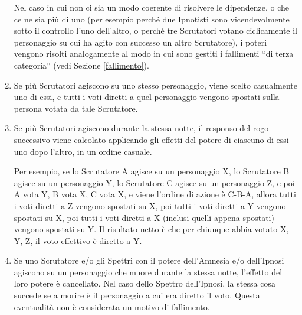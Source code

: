 \documentclass[a4paper,10pt]{article}
\begin{document}
\begin{enumerate}
	Nel caso in cui non ci sia un modo coerente di risolvere le dipendenze, o che ce ne sia più di uno (per esempio perché due Ipnotisti sono vicendevolmente sotto il controllo l'uno dell'altro, o perché tre Scrutatori votano ciclicamente il personaggio su cui ha agito con successo un altro Scrutatore), i poteri vengono risolti analogamente al modo in cui sono gestiti i fallimenti ``di terza categoria'' (vedi Sezione \ref{fallimento}).
	
		
	
 
	\item Se più Scrutatori agiscono su uno stesso personaggio, viene scelto casualmente uno di essi, e tutti i voti diretti a quel personaggio vengono spostati sulla persona votata da tale Scrutatore.

	\item Se più Scrutatori agiscono durante la stessa notte, il responso del rogo successivo viene calcolato applicando gli effetti del potere di ciascuno di essi uno dopo l'altro, in un ordine casuale.
	
	Per esempio, se lo Scrutatore A agisce su un personaggio X, lo Scrutatore B agisce su un personaggio Y, lo Scrutatore C agisce su un personaggio Z, e poi A vota Y, B vota X, C vota X, e viene l'ordine di azione è C-B-A, allora tutti i voti diretti a Z vengono spostati su X, poi tutti i voti diretti a Y vengono spostati su X, poi tutti i voti diretti a X (inclusi quelli appena spostati) vengono spostati su Y. Il risultato netto è che per chiunque abbia votato X, Y, Z, il voto effettivo è diretto a Y.
 
	\item Se uno Scrutatore e/o gli Spettri con il potere dell'Amnesia e/o dell'Ipnosi agiscono su un personaggio che muore durante la stessa notte, l'effetto del loro potere è cancellato. 
	Nel caso dello Spettro dell'Ipnosi, la stessa cosa succede se a morire è il personaggio a cui era diretto il voto. Questa eventualità non è considerata un motivo di fallimento.
	

\end{enumerate}
\end{document}
